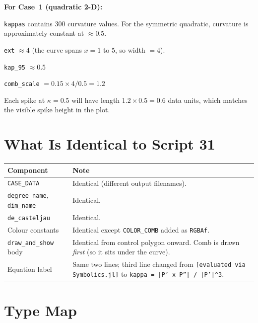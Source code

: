 \documentclass[12pt, a4paper]{article}
\newcommand{\cd}[1]{\texttt{#1}}
\begin{document}
\begin{examplebox}
\textbf{For Case~1 (quadratic 2-D):}

\cd{kappas} contains 300 curvature values.
For the symmetric quadratic, curvature is approximately
constant at $\approx 0.5$.

\cd{ext} $\approx 4$ (the curve spans $x = 1$ to $5$,
so width $= 4$).

\cd{kap\_95} $\approx 0.5$

\cd{comb\_scale} $= 0.15 \times 4 / 0.5 = 1.2$

Each spike at $\kappa = 0.5$ will have length
$1.2 \times 0.5 = 0.6$ data units, which matches
the visible spike height in the plot.
\end{examplebox}


\section{What Is Identical to Script 31}

\begin{samebox}
\begin{tabular}{lp{9.5cm}}
\toprule
Component & Note \\
\midrule
\cd{CASE\_DATA} & Identical (different output filenames). \\
\cd{degree\_name}, \cd{dim\_name} & Identical. \\
\cd{de\_casteljau} & Identical. \\
Colour constants & Identical except \cd{COLOR\_COMB}
  added as \cd{RGBAf}. \\
\cd{draw\_and\_show} body & Identical from control polygon onward.
  Comb is drawn \emph{first} (so it sits under the curve). \\
Equation label & Same two lines; third line changed from
  \cd{[evaluated via Symbolics.jl]} to
  \cd{kappa = |P' x P''| / |P'|\^{}3}. \\
\bottomrule
\end{tabular}
\end{samebox}


\section{Type Map}
\end{document}
